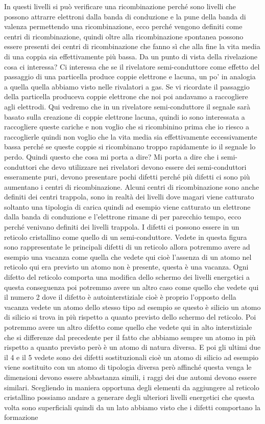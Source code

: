 {In questi livelli si può verificare una ricombinazione perché sono livelli che possono attrarre elettroni dalla banda di conduzione e la pune della banda di valenza permettendo una ricombinazione, ecco perché vengono definiti come centri di ricombinazione, quindi oltre alla ricombinazione spontanea possono essere presenti dei centri di ricombinazione che fanno sì che alla fine la vita media di una coppia sia effettivamente più bassa. Da un punto di vista della rivelazione cosa ci interessa? Ci interessa che se il rivelatore semi-conduttore come effetto del passaggio di una particella produce coppie elettrone e lacuna, un po' in analogia a quella quella abbiamo visto nelle rivalatori a gas. Se vi ricordate il passaggio della particella produceva coppie elettrone che noi poi andavamo a raccogliere agli elettrodi. Qui vedremo che in un rivelatore semi-conduttore il segnale sarà basato sulla creazione di coppie elettrone lacuna, quindi io sono interessata a raccogliere queste cariche e non voglio che si ricombinino prima che io riesco a raccoglierle quindi non voglio che la vita media sia effettivamente eccessivamente bassa perché se queste coppie si ricombinano troppo rapidamente io il segnale lo perdo. Quindi questo che cosa mi porta a dire? Mi porta a dire che i semi-conduttori che devo utilizzare nei rivelatori devono essere dei semi-conduttori esseramente puri, devono presentare pochi difetti perché più difetti ci sono più aumentano i centri di ricombinazione. Alcuni centri di ricombinazione sono anche definiti dei centri trappola, sono in realtà dei livelli dove magari viene catturato soltanto una tipologia di carica quindi ad esempio viene catturato un elettrone dalla banda di conduzione e l'elettrone rimane di per parecchio tempo, ecco perché venivano definiti dei livelli trappola. I difetti ci possono essere in un reticolo cristallino come quello di un semi-conduttore. Vedete in questa figura sono rappresentate le principali difetti di un reticolo allora potremmo avere ad esempio una vacanza come quella che vedete qui cioè l'assenza di un atomo nel reticolo qui era previsto un atomo non è presente, questa è una vacanza. Ogni difetto del reticolo comporta una modifica dello schermo dei livelli energetici a questa conseguenza poi potremmo avere un altro caso come quello che vedete qui il numero 2 dove il difetto è autointerstiziale cioè è proprio l'opposto della vacanza vedete un atomo dello stesso tipo ad esempio se questo è silicio un atomo di silicio si trova in più rispetto a quanto previsto dello schermo del reticolo. Poi potremmo avere un altro difetto come quello che vedete qui in alto interstiziale che si differenze dal precedente per il fatto che abbiamo sempre un atomo in più rispetto a quanto previsto però è un atomo di natura diversa. E poi gli ultimi due il 4 e il 5 vedete sono dei difetti sostituzionali cioè un atomo di silicio ad esempio viene sostituito con un atomo di tipologia diversa però affinché questa venga le dimensioni devono essere abbastanza simili, i raggi dei due automi devono essere similari. Scegliendo in maniera opportuna degli elementi da aggiungere al reticolo cristallino possiamo andare a generare degli ulteriori livelli energetici che questa volta sono superficiali quindi da un lato abbiamo visto che i difetti comportano la formazione }
